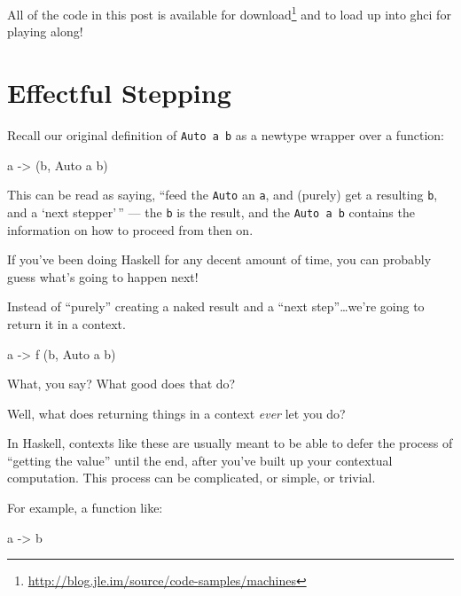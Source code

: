 \documentclass[]{article}
\newenvironment{Shaded}{}{}
\newcommand{\DataTypeTok}[1]{\textcolor[rgb]{0.56,0.13,0.00}{{#1}}}
\newcommand{\OtherTok}[1]{\textcolor[rgb]{0.00,0.44,0.13}{{#1}}}
\newcommand{\NormalTok}[1]{{#1}}
\renewcommand{\href}[2]{#2\footnote{\url{#1}}}
\begin{document}
All of the code in this post is
\href{http://blog.jle.im/source/code-samples/machines}{available for
download} and to load up into ghci for playing along!

\section{Effectful Stepping}\label{effectful-stepping}

Recall our original definition of \texttt{Auto\ a\ b} as a newtype
wrapper over a function:

\begin{Shaded}
\begin{Highlighting}[]
\NormalTok{a }\OtherTok{->} \NormalTok{(b, }\DataTypeTok{Auto} \NormalTok{a b)}
\end{Highlighting}
\end{Shaded}

This can be read as saying, ``feed the \texttt{Auto} an \texttt{a}, and
(purely) get a resulting \texttt{b}, and a `next stepper'\,'' --- the
\texttt{b} is the result, and the \texttt{Auto\ a\ b} contains the
information on how to proceed from then on.

If you've been doing Haskell for any decent amount of time, you can
probably guess what's going to happen next!

Instead of ``purely'' creating a naked result and a ``next
step''\ldots{}we're going to return it in a context.

\begin{Shaded}
\begin{Highlighting}[]
\NormalTok{a }\OtherTok{->} \NormalTok{f (b, }\DataTypeTok{Auto} \NormalTok{a b)}
\end{Highlighting}
\end{Shaded}

What, you say? What good does that do?

Well, what does returning things in a context \emph{ever} let you do?

In Haskell, contexts like these are usually meant to be able to defer
the process of ``getting the value'' until the end, after you've built
up your contextual computation. This process can be complicated, or
simple, or trivial.

For example, a function like:

\begin{Shaded}
\begin{Highlighting}[]
\NormalTok{a }\OtherTok{->} \NormalTok{b}
\end{Highlighting}
\end{Shaded}
\end{document}
